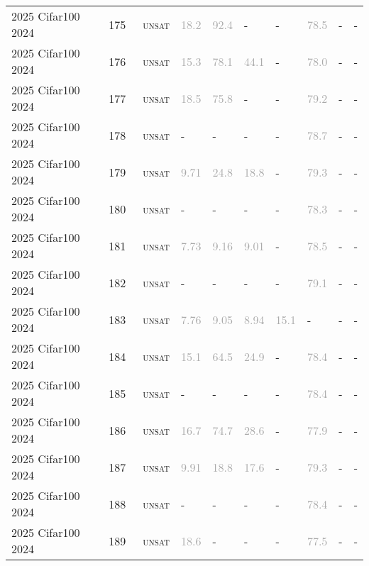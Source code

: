 \begin{center}
{\begin{longtable}{@{}llllllllll@{}}
2025 Cifar100 2024 & 175 & ~\textsc{unsat} & \textcolor{darkgray}{18.2} & \textcolor{darkgray}{92.4} & - & - & \textcolor{darkgray}{78.5} & - & - \\
2025 Cifar100 2024 & 176 & ~\textsc{unsat} & \textcolor{darkgray}{15.3} & \textcolor{darkgray}{78.1} & \textcolor{darkgray}{44.1} & - & \textcolor{darkgray}{78.0} & - & - \\
2025 Cifar100 2024 & 177 & ~\textsc{unsat} & \textcolor{darkgray}{18.5} & \textcolor{darkgray}{75.8} & - & - & \textcolor{darkgray}{79.2} & - & - \\
2025 Cifar100 2024 & 178 & ~\textsc{unsat} & - & - & - & - & \textcolor{darkgray}{78.7} & - & - \\
2025 Cifar100 2024 & 179 & ~\textsc{unsat} & \textcolor{darkgray}{9.71} & \textcolor{darkgray}{24.8} & \textcolor{darkgray}{18.8} & - & \textcolor{darkgray}{79.3} & - & - \\
2025 Cifar100 2024 & 180 & ~\textsc{unsat} & - & - & - & - & \textcolor{darkgray}{78.3} & - & - \\
2025 Cifar100 2024 & 181 & ~\textsc{unsat} & \textcolor{darkgray}{7.73} & \textcolor{darkgray}{9.16} & \textcolor{darkgray}{9.01} & - & \textcolor{darkgray}{78.5} & - & - \\
2025 Cifar100 2024 & 182 & ~\textsc{unsat} & - & - & - & - & \textcolor{darkgray}{79.1} & - & - \\
2025 Cifar100 2024 & 183 & ~\textsc{unsat} & \textcolor{darkgray}{7.76} & \textcolor{darkgray}{9.05} & \textcolor{darkgray}{8.94} & \textcolor{darkgray}{15.1} & - & - & - \\
2025 Cifar100 2024 & 184 & ~\textsc{unsat} & \textcolor{darkgray}{15.1} & \textcolor{darkgray}{64.5} & \textcolor{darkgray}{24.9} & - & \textcolor{darkgray}{78.4} & - & - \\
2025 Cifar100 2024 & 185 & ~\textsc{unsat} & - & - & - & - & \textcolor{darkgray}{78.4} & - & - \\
2025 Cifar100 2024 & 186 & ~\textsc{unsat} & \textcolor{darkgray}{16.7} & \textcolor{darkgray}{74.7} & \textcolor{darkgray}{28.6} & - & \textcolor{darkgray}{77.9} & - & - \\
2025 Cifar100 2024 & 187 & ~\textsc{unsat} & \textcolor{darkgray}{9.91} & \textcolor{darkgray}{18.8} & \textcolor{darkgray}{17.6} & - & \textcolor{darkgray}{79.3} & - & - \\
2025 Cifar100 2024 & 188 & ~\textsc{unsat} & - & - & - & - & \textcolor{darkgray}{78.4} & - & - \\
2025 Cifar100 2024 & 189 & ~\textsc{unsat} & \textcolor{darkgray}{18.6} & - & - & - & \textcolor{darkgray}{77.5} & - & - \\

\end{longtable}}
\end{center}
